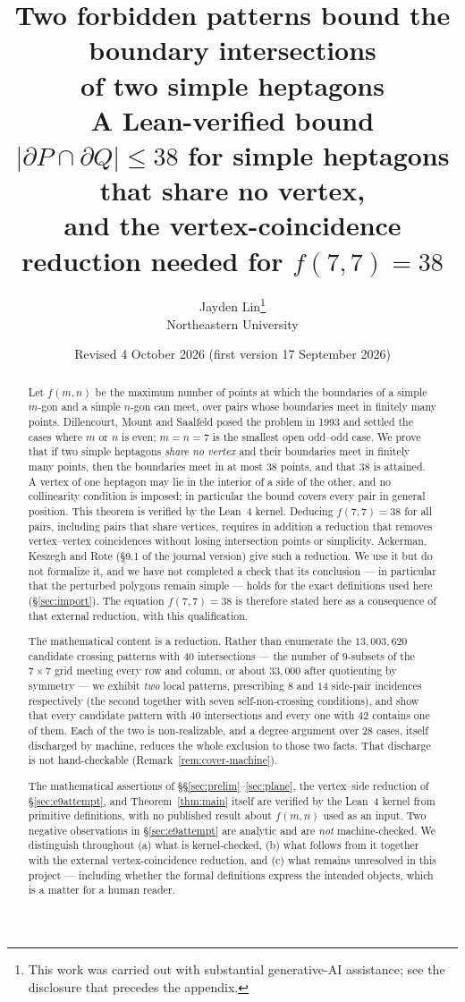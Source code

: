 \documentclass[11pt,a4paper]{article}
\title{Two forbidden patterns bound the boundary intersections\\
of two simple heptagons\\[2mm]
\large A Lean-verified bound $\lvert\partial P\cap\partial Q\rvert\le 38$
for simple heptagons that share no vertex,\\
and the vertex-coincidence reduction needed for $f(7,7)=38$}
\author{Jayden Lin\thanks{This work was carried out with substantial
generative-AI assistance; see the disclosure that precedes the appendix.}\\[2pt]
\normalsize Northeastern University}
\date{Revised 4 October 2026 (first version 17 September 2026)}
\theoremstyle{plain}
\theoremstyle{definition}
\theoremstyle{remark}
\begin{document}
\maketitle

\begin{abstract}
Let $f(m,n)$ be the maximum number of points at which the boundaries of a
simple $m$-gon and a simple $n$-gon can meet, over pairs whose boundaries meet
in finitely many points. Dillencourt, Mount and Saalfeld posed the problem in
1993 and settled the cases where $m$ or $n$ is even; $m=n=7$ is the smallest
open odd--odd case. We prove that if two simple heptagons \emph{share no
vertex} and their boundaries meet in finitely many points, then the boundaries
meet in at most $38$ points, and that $38$ is attained. A vertex of one
heptagon may lie in the interior of a side of the other, and no collinearity
condition is imposed; in particular the bound covers every pair in general
position. This theorem is verified by the Lean~4 kernel. Deducing $f(7,7)=38$
for all pairs, including pairs that share vertices, requires in addition a
reduction that removes vertex--vertex coincidences without losing intersection
points or simplicity. Ackerman, Keszegh and Rote (\S9.1 of the journal version)
give such a reduction. We use it but do not formalize it, and we have not
completed a check that its conclusion --- in particular that the perturbed
polygons remain simple --- holds for the exact definitions used here
(\S\ref{sec:import}). The equation $f(7,7)=38$ is therefore stated here as a
consequence of that external reduction, with this qualification.

The mathematical content is a reduction. Rather than enumerate the
$13{,}003{,}620$ candidate crossing patterns with $40$ intersections --- the
number of $9$-subsets of the $7\times7$ grid meeting every row and column, or
about $33{,}000$ after quotienting by symmetry --- we
exhibit \emph{two} local patterns, prescribing $8$ and $14$ side-pair
incidences respectively (the second together with seven self-non-crossing
conditions), and show that every candidate pattern with $40$
intersections and every one with $42$ contains one of them. Each of the two is
non-realizable, and a degree argument over $28$ cases, itself discharged by
machine, reduces the whole exclusion to those two facts. That discharge is not
hand-checkable (Remark~\ref{rem:cover-machine}).

The mathematical assertions of \S\S\ref{sec:prelim}--\ref{sec:plane}, the
vertex--side reduction of \S\ref{sec:e9attempt}, and
Theorem~\ref{thm:main} itself are verified by the Lean~4 kernel from primitive
definitions, with no published result about $f(m,n)$ used as an input. Two
negative observations in \S\ref{sec:e9attempt} are analytic and are \emph{not}
machine-checked. We distinguish throughout (a) what is kernel-checked,
(b) what follows from it together with the external vertex-coincidence
reduction, and (c) what remains unresolved in this project --- including
whether the formal definitions express the intended objects, which is a matter
for a human reader.
\end{abstract}
\end{document}
